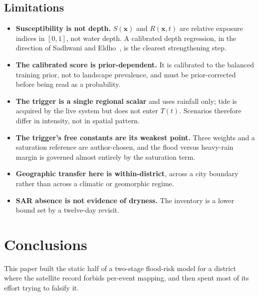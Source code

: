 \documentclass[journal]{IEEEtran}
\newcommand{\Sx}{S(\mathbf{x})}
\newcommand{\Tt}{T(t)}
\newcommand{\Rxt}{R(\mathbf{x},t)}
\begin{document}
\subsection{Limitations}
\label{sec:limitations}
\begin{itemize}
\item \textbf{Susceptibility is not depth.} $\Sx$ and $\Rxt$ are relative
      exposure indices in $[0,1]$, not water depth. A calibrated depth
      regression, in the direction of Sadhwani and Eldho~\cite{sadhwani2026},
      is the clearest strengthening step.
\item \textbf{The calibrated score is prior-dependent.} It is calibrated to the
      balanced training prior, not to landscape prevalence, and must be
      prior-corrected before being read as a probability.
\item \textbf{The trigger is a single regional scalar} and uses rainfall only;
      tide is acquired by the live system but does not enter $\Tt$. Scenarios
      therefore differ in intensity, not in spatial pattern.
\item \textbf{The trigger's free constants are its weakest point.} Three weights
      and a saturation reference are author-chosen, and the flood versus
      heavy-rain margin is governed almost entirely by the saturation term.
\item \textbf{Geographic transfer here is within-district}, across a city
      boundary rather than across a climatic or geomorphic regime.
\item \textbf{SAR absence is not evidence of dryness.} The inventory is a lower
      bound set by a twelve-day revisit.
\end{itemize}
\section{Conclusions}
This paper built the static half of a two-stage flood-risk model for a district
where the satellite record forbids per-event mapping, and then spent most of its
effort trying to falsify it.
\end{document}
